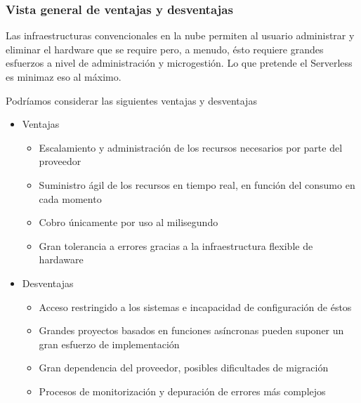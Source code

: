 \subsubsection{Vista general de ventajas y desventajas}
Las infraestructuras convencionales en la nube permiten al usuario administrar y eliminar el hardware que se require pero, a menudo, ésto requiere grandes esfuerzos a nivel de administración y microgestión. Lo que pretende el Serverless es minimaz eso al máximo.
\vspace{1em}
\par Podríamos considerar las siguientes ventajas y desventajas
\begin{itemize}
    \item Ventajas
    \begin{itemize}
        \item Escalamiento y administración de los recursos necesarios por parte del proveedor
        \item Suministro ágil de los recursos en tiempo real, en función del consumo en cada momento
        \item Cobro únicamente por uso al milisegundo
        \item Gran tolerancia a errores gracias a la infraestructura flexible de hardaware
    \end{itemize}
    \item Desventajas
    \begin{itemize}
        \item Acceso restringido a los sistemas e incapacidad de configuración de éstos
        \item Grandes proyectos basados en funciones asíncronas pueden suponer un gran esfuerzo de implementación
        \item Gran dependencia del proveedor, posibles dificultades de migración
        \item Procesos de monitorización y depuración de errores más complejos
    \end{itemize}
\end{itemize}
